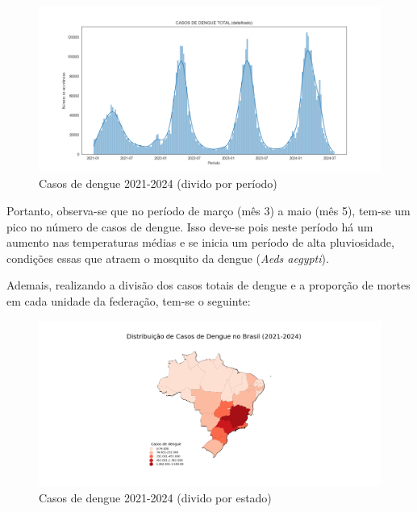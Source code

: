 \documentclass[a4paper,12pt]{article}
\begin{document}
\begin{figure}[H]
    \centering
    \includegraphics[width=1.0\textwidth]{images/By period (detailed) total.png}
    \caption{Casos de dengue 2021-2024 (divido por período)}
    \label{fig:by_period_total}
\end{figure}

Portanto, observa-se que no período de março (mês 3) a maio (mês 5), tem-se um pico no número de casos de dengue. Isso deve-se pois neste período há um aumento nas temperaturas médias e se inicia um período de alta pluviosidade, condições essas que atraem o mosquito da dengue (\emph{Aeds aegypti}).

Ademais, realizando a divisão dos casos totais de dengue e a proporção de mortes em cada unidade da federação, tem-se o seguinte:

\begin{figure}[H]
    \centering
    \includegraphics[width=1.0\textwidth]{images/Heatamp (uf) total.png}
    \caption{Casos de dengue 2021-2024 (divido por estado)}
    \label{fig:heatmap_total}
\end{figure}
\end{document}
